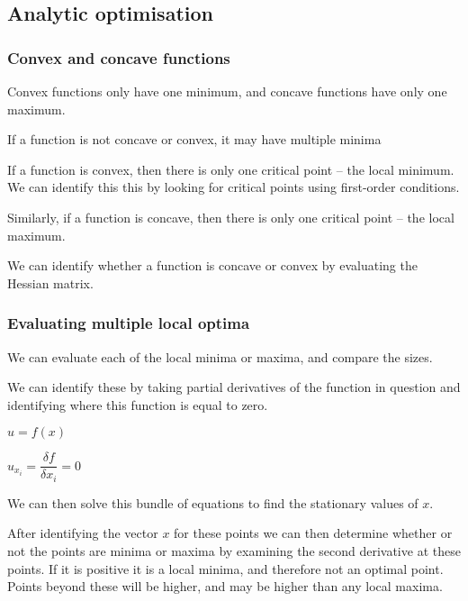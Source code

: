 
\subsection{Analytic optimisation}

\subsubsection{Convex and concave functions}

Convex functions only have one minimum, and concave functions have only one maximum.

If a function is not concave or convex, it may have multiple minima

If a function is convex, then there is only one critical point – the local minimum. We can identify this this by looking for critical points using first-order conditions.

Similarly, if a function is concave, then there is only one critical point – the local maximum.

We can identify whether a function is concave or convex by evaluating the Hessian matrix.

\subsubsection{Evaluating multiple local optima}

We can evaluate each of the local minima or maxima, and compare the sizes.

We can identify these by taking partial derivatives of the function in question and identifying where this function is equal to zero.

\(u=f(x)\)

\(u_{x_i}=\dfrac{\delta f}{\delta x_i}=0\)

We can then solve this bundle of equations to find the stationary values of \(x\).

After identifying the vector \(x\) for these points we can then  determine whether or not the points are minima or maxima by  examining the second derivative at these points. If it is positive it is a local minima, and therefore not an optimal point. Points beyond these will be higher, and may be higher than any local maxima.


